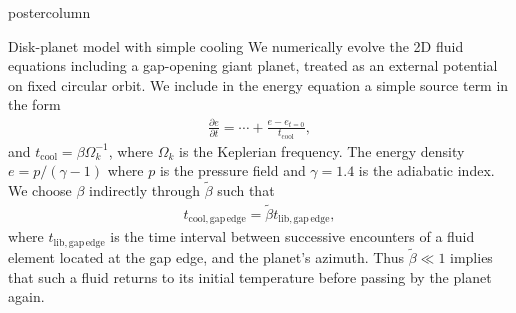 \documentclass[final,hyperref={pdfpagelabels=false}]{beamer}
\begin{document}
\begin{frame}
\begin{columns}
\begin{column}{.49\textwidth}
\begin{beamercolorbox}[center,wd=\textwidth]{postercolumn}
\begin{minipage}[T]{.95\textwidth}
{            \begin{block}{{\Large Disk-planet model with simple
                  cooling}}
              \justifying
             We numerically evolve the 2D fluid equations including a
             gap-opening giant planet, treated as an external
             potential on fixed circular orbit. We include in the
             energy equation  
        a simple source term in the form 
	\begin{align*}
	\frac{\partial e}{\partial t} = \cdots + \frac{e-e_{t=0}}{t_\mathrm{cool}},
	\end{align*}
        and $t_\mathrm{cool} = \beta \Omega_k^{-1}$, where $\Omega_k$
        is the Keplerian frequency. The energy density
        $e=p/(\gamma-1)$ where $p$ is the pressure field and
        $\gamma=1.4$ is the adiabatic index. We choose $\beta$ indirectly 
        through $\tilde{\beta}$ such that
        \begin{align*}
        t_\mathrm{cool, gap\,edge} = \tilde{\beta} t_\mathrm{lib, gap\,edge},
        \end{align*}
        where $t_\mathrm{lib, gap\,edge}$ is the time interval between
        successive encounters of a fluid element 
        located at the gap edge, and the planet's azimuth. Thus $\tilde{\beta}\ll 1$ implies that such a fluid returns to its initial temperature
        before passing by the planet again. 
        \end{block}
        \vfill

}
\end{minipage}
\end{beamercolorbox}
\end{column}
\end{columns}
\end{frame}
\end{document}
